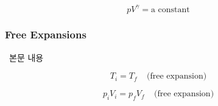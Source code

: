 \begin{equation} pV^{\gamma} = \text{a constant} \end{equation}

\subsubsection{Free Expansions}
%
\ 본문 내용

\begin{equation} T_i = T_f ~~~~~ \text{(free expansion)} \end{equation}

\begin{equation} p_i V_i = p_f V_f ~~~~~ \text{(free expansion)} \end{equation}